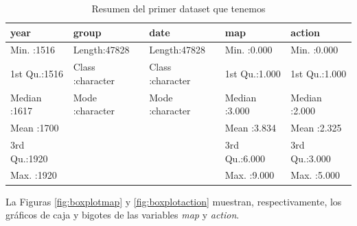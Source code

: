 \begin{table}[ht]
\centering
\begin{tabular}{lllll}
  \hline
     year &    group &     date &      map &     action \\ 
  \hline
Min.   :1516   & Length:47828       & Length:47828       & Min.   :0.000   & Min.   :0.000   \\ 
  1st Qu.:1516   & Class :character   & Class :character   & 1st Qu.:1.000   & 1st Qu.:1.000   \\ 
  Median :1617   & Mode  :character   & Mode  :character   & Median :3.000   & Median :2.000   \\ 
  Mean   :1700   &  &  & Mean   :3.834   & Mean   :2.325   \\ 
  3rd Qu.:1920   &  &  & 3rd Qu.:6.000   & 3rd Qu.:3.000   \\ 
  Max.   :1920   &  &  & Max.   :9.000   & Max.   :5.000   \\ 
   \hline
\end{tabular}
\caption{Resumen del primer dataset que tenemos}
\label{table:2}
\end{table}

La Figuras \ref{fig:boxplotmap} y \ref{fig:boxplotaction} muestran, respectivamente, los gráficos de caja y bigotes de las variables \emph{map} y \emph{action}.

